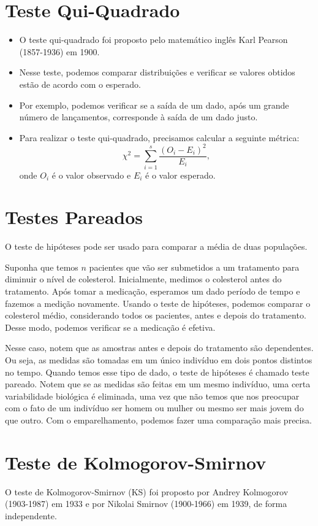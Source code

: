 \documentclass{article}
\begin{document}
\section{Teste Qui-Quadrado}
\begin{itemize}
    \item O teste qui-quadrado foi proposto pelo matemático inglês Karl Pearson (1857-1936) em 1900.
    \item Nesse teste, podemos comparar distribuições e verificar se valores obtidos estão de acordo com o esperado.
    \item Por exemplo, podemos verificar se a saída de um dado, após um grande número de lançamentos, corresponde à saída de um dado justo.
    \item Para realizar o teste qui-quadrado, precisamos calcular a seguinte métrica:
        $$
        \chi^2 = \sum_{i=1}^{s} \frac{(O_i - E_i)^2}{E_i},
        $$
    onde $O_i$ é o valor observado e $E_i$ é o valor esperado.
\end{itemize}

\section{Testes Pareados}
O teste de hipóteses pode ser usado para comparar a média de duas populações.

Suponha que temos $n$ pacientes que vão ser submetidos a um tratamento para diminuir o nível de colesterol. Inicialmente, medimos o colesterol antes do tratamento. Após tomar a medicação, esperamos um dado período de tempo e fazemos a medição novamente. Usando o teste de hipóteses, podemos comparar o colesterol médio, considerando todos os pacientes, antes e depois do tratamento. Desse modo, podemos verificar se a medicação é efetiva.

Nesse caso, notem que as amostras antes e depois do tratamento são dependentes. Ou seja, as medidas são tomadas em um único indivíduo em dois pontos distintos no tempo. Quando temos esse tipo de dado, o teste de hipóteses é chamado teste pareado. Notem que se as medidas são feitas em um mesmo indivíduo, uma certa variabilidade biológica é eliminada, uma vez que não temos que nos preocupar com o fato de um indivíduo ser homem ou mulher ou mesmo ser mais jovem do que outro. Com o emparelhamento, podemos fazer uma comparação mais precisa.

\section{Teste de Kolmogorov-Smirnov}
O teste de Kolmogorov-Smirnov (KS) foi proposto por Andrey Kolmogorov (1903-1987) em 1933 e por Nikolai Smirnov (1900-1966) em 1939, de forma independente.
\end{document}
